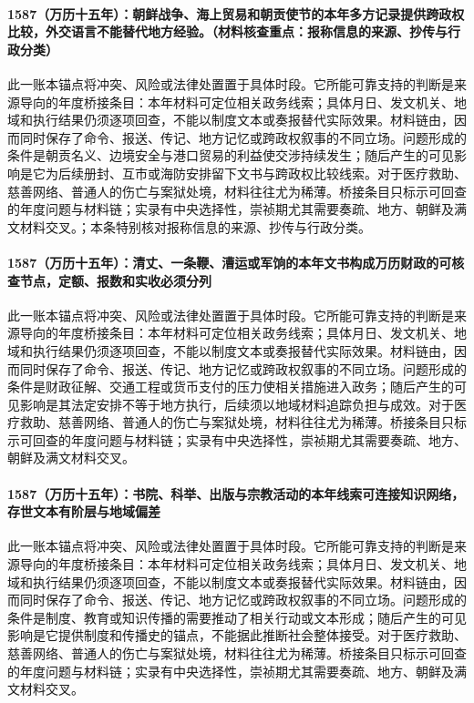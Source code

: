 \paragraph{1587（万历十五年）：朝鲜战争、海上贸易和朝贡使节的本年多方记录提供跨政权比较，外交语言不能替代地方经验。（材料核查重点：报称信息的来源、抄传与行政分类）} 此一账本锚点将冲突、风险或法律处置置于具体时段。它所能可靠支持的判断是来源导向的年度桥接条目：本年材料可定位相关政务线索；具体月日、发文机关、地域和执行结果仍须逐项回查，不能以制度文本或奏报替代实际效果。材料链由，因而同时保存了命令、报送、传记、地方记忆或跨政权叙事的不同立场。问题形成的条件是朝贡名义、边境安全与港口贸易的利益使交涉持续发生；随后产生的可见影响是它为后续册封、互市或海防安排留下文书与跨政权比较线索。对于医疗救助、慈善网络、普通人的伤亡与案狱处境，材料往往尤为稀薄。桥接条目只标示可回查的年度问题与材料链；实录有中央选择性，崇祯期尤其需要奏疏、地方、朝鲜及满文材料交叉。；本条特别核对报称信息的来源、抄传与行政分类。

\paragraph{1587（万历十五年）：清丈、一条鞭、漕运或军饷的本年文书构成万历财政的可核查节点，定额、报数和实收必须分列} 此一账本锚点将冲突、风险或法律处置置于具体时段。它所能可靠支持的判断是来源导向的年度桥接条目：本年材料可定位相关政务线索；具体月日、发文机关、地域和执行结果仍须逐项回查，不能以制度文本或奏报替代实际效果。材料链由，因而同时保存了命令、报送、传记、地方记忆或跨政权叙事的不同立场。问题形成的条件是财政征解、交通工程或货币支付的压力使相关措施进入政务；随后产生的可见影响是其法定安排不等于地方执行，后续须以地域材料追踪负担与成效。对于医疗救助、慈善网络、普通人的伤亡与案狱处境，材料往往尤为稀薄。桥接条目只标示可回查的年度问题与材料链；实录有中央选择性，崇祯期尤其需要奏疏、地方、朝鲜及满文材料交叉。

\paragraph{1587（万历十五年）：书院、科举、出版与宗教活动的本年线索可连接知识网络，存世文本有阶层与地域偏差} 此一账本锚点将冲突、风险或法律处置置于具体时段。它所能可靠支持的判断是来源导向的年度桥接条目：本年材料可定位相关政务线索；具体月日、发文机关、地域和执行结果仍须逐项回查，不能以制度文本或奏报替代实际效果。材料链由，因而同时保存了命令、报送、传记、地方记忆或跨政权叙事的不同立场。问题形成的条件是制度、教育或知识传播的需要推动了相关行动或文本形成；随后产生的可见影响是它提供制度和传播史的锚点，不能据此推断社会整体接受。对于医疗救助、慈善网络、普通人的伤亡与案狱处境，材料往往尤为稀薄。桥接条目只标示可回查的年度问题与材料链；实录有中央选择性，崇祯期尤其需要奏疏、地方、朝鲜及满文材料交叉。

